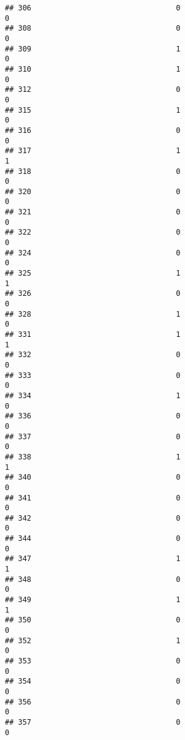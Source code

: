 \documentclass[
]{article}
\begin{document}
\begin{verbatim}
## 306                                 0                                0
## 308                                 0                                0
## 309                                 1                                0
## 310                                 1                                0
## 312                                 0                                0
## 315                                 1                                0
## 316                                 0                                0
## 317                                 1                                1
## 318                                 0                                0
## 320                                 0                                0
## 321                                 0                                0
## 322                                 0                                0
## 324                                 0                                0
## 325                                 1                                1
## 326                                 0                                0
## 328                                 1                                0
## 331                                 1                                1
## 332                                 0                                0
## 333                                 0                                0
## 334                                 1                                0
## 336                                 0                                0
## 337                                 0                                0
## 338                                 1                                1
## 340                                 0                                0
## 341                                 0                                0
## 342                                 0                                0
## 344                                 0                                0
## 347                                 1                                1
## 348                                 0                                0
## 349                                 1                                1
## 350                                 0                                0
## 352                                 1                                0
## 353                                 0                                0
## 354                                 0                                0
## 356                                 0                                0
## 357                                 0                                0

\end{verbatim}
\end{document}
